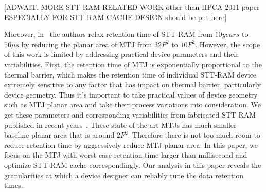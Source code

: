 [ADWAIT, MORE STT-RAM RELATED WORK other than HPCA 2011 paper ESPECIALLY FOR STT-RAM CACHE DESIGN should be put here]

Moreover, in~\cite{STTRAM:HPCA11} the authors relax retention time of STT-RAM from $10 years$ to $56 \mu s$ by reducing the planar area of MTJ from $32F^2$ to $10F^2$. However, the scope of this work is limited by addressing practical device parameters and their variabilities. First, the retention time of MTJ is exponentially proportional to the thermal barrier, which makes the retention time of individual STT-RAM device extremely sensitive to any factor that has impact on thermal barrier, particularly device geometry. Thus it's important to take practical values of device geometry such as MTJ planar area and take their process variations into consideration. We get these parameters and corresponding variabilities from fabricated STT-RAM published in recent years~\cite{PMTJ:Toshiba08,STTRAM:EDL11,STTRAM:Qualcomm09,STTRAM:Grandis11}. These state-of-the-art MTJs has much smaller baseline planar area that is around $2F^2$. Therefore there is not too much room to reduce retention time by aggressively reduce MTJ planar area. In this paper, we focus on the MTJ with worst-case retention time larger than millisecond and optimize STT-RAM cache correspondingly. Our analysis in this paper reveals the granularities at which a device designer can reliably tune the data retention times. 